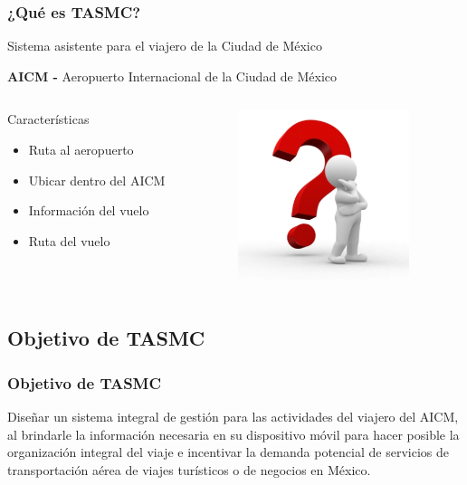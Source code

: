 \documentclass[12pt]{beamer}
\begin{document}
\begin{frame}[c]
	\frametitle{¿Qué es TASMC?}
	\begin{block}{}
		Sistema asistente para el viajero de la Ciudad de México
	\end{block}
	\begin{block}{}
	 	\textbf{AICM - } Aeropuerto Internacional de la Ciudad de México
	\end{block}
	\begin{columns} 
		\begin{column}{5cm}
			\begin{block}{Características} \small 
				\begin{itemize}
					\item Ruta al aeropuerto
					\item Ubicar dentro del AICM
					\item Información del vuelo
					\item Ruta del vuelo
				\end{itemize} 
			\end{block} 
		\end{column}
		\begin{column}{4cm} 
			\begin{center}
				\includegraphics[height=5cm]{imagenes/queEs.jpg}
			\end{center} 
		\end{column} 
	\end{columns}
\end{frame}

\subsection{Objetivo de TASMC}

\begin{frame}
	\frametitle{Objetivo de TASMC}
	\begin{block}{}
		\justifying
		Diseñar un sistema integral de gestión para las actividades del viajero del AICM, al brindarle la información 						necesaria en su dispositivo móvil para hacer posible la organización integral del viaje e incentivar la demanda 					potencial de servicios de transportación aérea de viajes turísticos o de negocios en México.
	\end{block}
\end{frame}
\end{document}
